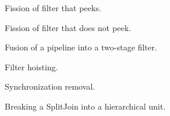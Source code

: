 \begin{figure}
\vspace{-6pt}
\centering
{}
\vspace{-12pt}
\caption{\protect\small Fission of filter that peeks.
\protect\label{fig:fission-peek}}
\vspace{-6pt}
\end{figure}

\begin{figure}
\vspace{-6pt}
\centering
{}
\vspace{-12pt}
\caption{\protect\small Fission of filter that does not peek.
\protect\label{fig:fission-nopeek}}
\vspace{-6pt}
\end{figure}

\begin{figure}
\vspace{-6pt}
\centering
{}
\vspace{-12pt}
\caption{\protect\small Fusion of a pipeline into a two-stage filter.
\protect\label{fig:fuse-pipe}}
\vspace{-6pt}
\end{figure}

\begin{figure}
\vspace{-6pt}
\centering
{}
\vspace{-12pt}
\caption{\protect\small Filter hoisting.
\protect\label{fig:fuse-splitjoin}}
\vspace{-6pt}
\end{figure}

\begin{figure}
\vspace{-6pt}
\centering
{}
\vspace{-12pt}
\caption{\protect\small Synchronization removal.
\protect\label{fig:sync-removal}}
\vspace{-6pt}
\end{figure}

\begin{figure}
\vspace{-6pt}
\centering
{}
\vspace{-12pt}
\caption{\protect\small Breaking a SplitJoin into a hierarchical unit.
\protect\label{fig:splitjoin-split}}
\vspace{-6pt}
\end{figure}

